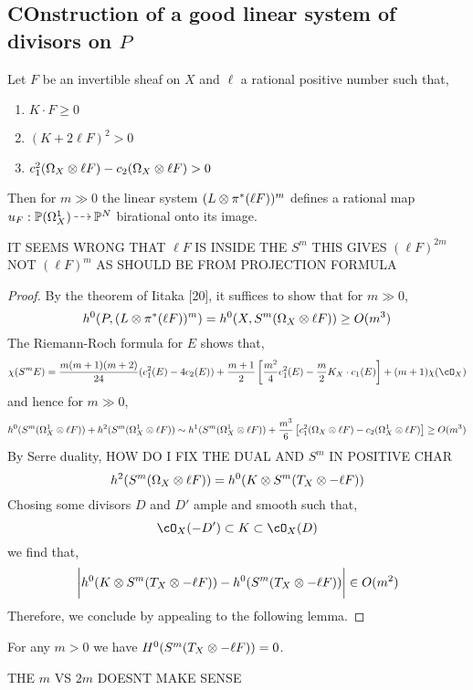 \documentclass[12pt]{article}
\begin{document}
\subsection{COnstruction of a good linear system of divisors on $P$}

\begin{prop}
Let $F$ be an invertible sheaf on $X$ and $\ell$ a rational positive number such that,
\begin{enumerate}
\item $K \cdot F \ge 0$
\item $(K + 2 \ell F)^2 > 0$
\item $c_1^2(\Omega_X \otimes \ell F) - c_2(\Omega_X \otimes \ell F) > 0$
\end{enumerate}
Then for $m \gg 0$ the linear system $(L \otimes \pi^* (\ell F))^m$ defines a rational map $u_F : \P(\Omega_X^1) \rat \P^N$ birational onto its image.
\end{prop}

{\color{red} IT SEEMS WRONG THAT $\ell F$ IS INSIDE THE $S^m$ THIS GIVES $(\ell F)^{2m}$ NOT $(\ell F)^{m}$ AS SHOULD BE FROM PROJECTION FORMULA}

\begin{proof}
By the theorem of Iitaka [20], it suffices to show that for $m \gg 0$,
\[ h^0(P, (L \otimes \pi^* (\ell F))^m) = h^0(X, S^m(\Omega_X \otimes \ell F)) \ge O(m^3) \]
The Riemann-Roch formula for $E$ shows that,
\[ \chi(S^m E) = \frac{m (m+1)(m+2)}{24} (c_1^2(E) - 4 c_2(E)) + \frac{m+1}{2} \left[ \frac{m^2}{4} c_1^2(E) - \frac{m}{2} K_X \cdot c_1(E) \right]  + (m + 1) \chi(\cO_X) \]
and hence for $m \gg 0$,
\[ h^0(S^m(\Omega_X^1 \otimes \ell F)) + h^2(S^m(\Omega_X^1 \otimes \ell F)) \sim h^1(S^m(\Omega_X^1 \otimes \ell F)) + \frac{m^3}{6} \left[ c_1^2(\Omega_X \otimes \ell F) - c_2(\Omega_X^1 \otimes \ell F) \right] \ge O(m^3) \]
By Serre duality, {\color{red} HOW DO I FIX THE DUAL AND $S^m$ IN POSITIVE CHAR}
\[ h^2(S^m(\Omega_X \otimes \ell F)) = h^0(K \otimes S^m(T_X \otimes -\ell F)) \]
Chosing some divisors $D$ and $D'$ ample and smooth such that,
\[ \cO_X(-D') \subset K \subset \cO_X(D) \]
we find that,
\[ \bigg| h^0(K \otimes S^m(T_X \otimes -\ell F)) - h^0(S^m(T_X \otimes -\ell F)) \bigg| \in O(m^2) \]
Therefore, we conclude by appealing to the following lemma.
\end{proof}

\begin{lemma}
For any $m > 0$ we have $H^0(S^m(T_X \otimes - \ell F)) = 0$.
\end{lemma}

{\color{red} THE $m$ VS $2m$ DOESNT MAKE SENSE}
\end{document}
